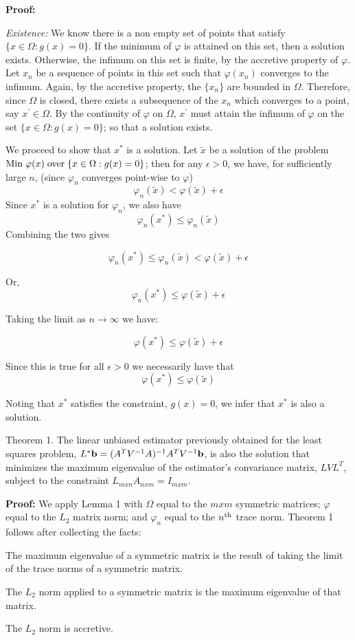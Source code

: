 {\bf Proof:\/} 

{\it Existence:\/}
We know there is a non empty set of points that satisfy
$\{x \in \Omega: g(x) = 0\}$. If the minimum of $\varphi$ is attained 
on this set, then a solution exists. Otherwise, the infimum on this set 
is finite, by the accretive property of $\varphi$. 
Let $x_n$ be a sequence of points in this set 
such that $\varphi(x_n)$ converges to the infimum. Again, by the
accretive property, the $\{x_n\}$ are bounded in $\Omega$. Therefore,
since $\Omega$ is closed, 
there exists a subsequence of the $x_n$ which converges to a point, say
$x^\prime \in \Omega$. By the continuity of $\varphi$ on $\Omega$,
$x^\prime$ 
must attain the infimum of
$\varphi$ on the set $\{x \in \Omega : g(x) = 0\}$; so that a solution exists.

We proceed to show that $x^*$ is a solution.
Let ${\tilde x}$ be a solution of the problem 
${\rm Min}\; \varphi(x) \; {\rm over} \; \{x \in \Omega : g(x) = 0\}$;
then for any $\epsilon > 0$, we have, for sufficiently large $n$, 
(since $\varphi_n$ converges point-wise to $\varphi$)
$$
 \varphi_n({\tilde x}) < \varphi({\tilde x}) + \epsilon
$$
Since $x^*$ is a solution for $\varphi_n$, we also have
$$
\varphi_n(x^*) \le \varphi_n({\tilde x})
$$
Combining the two gives

$$
\varphi_n(x^*) \le \varphi_n({\tilde x}) < \varphi({\tilde x}) + \epsilon
$$

Or,
$$
\varphi_n(x^*) \le \varphi({\tilde x}) + \epsilon
$$

Taking the limit as $n \rightarrow \infty$ we have:

$$
\varphi(x^*) \le \varphi({\tilde x}) + \epsilon
$$

Since this is true for all $\epsilon > 0$ we necessarily have that
$$
\varphi(x^*) \le \varphi({\tilde x})
$$

Noting that $x^*$ satisfies the constraint, $g(x) = 0$, we infer that 
$x^*$ is also a solution.


\proclaim Theorem 1. The linear unbiased estimator previously obtained for the
least squares problem, $L^*{\bf b} =
(A^TV^{-1}A)^{-1}A^TV^{-1}{\bf b}$, is also the solution that
minimizes the maximum eigenvalue of the estimator's convariance matrix, 
$LVL^T$, subject to the constraint $L_{mxn}A_{nxm} = I_{mxm}$.

{\bf Proof:\/} We apply Lemma 1 with $\Omega$ equal to the $mxm$ symmetric
matrices; $\varphi$ equal to the $L_2$ matrix norm; and
$\varphi_n$ equal to the $n^{\rm th}$ trace norm. Theorem 1 follows
after collecting the facts: 

\item{The maximum eigenvalue of a symmetric matrix is the result of 
taking the limit of the trace norms of a symmetric matrix.}
\item{The $L_2$ norm applied to a symmetric matrix is the maximum
eigenvalue of that matrix.}
\item{The $L_2$ norm is accretive.}


\bye
